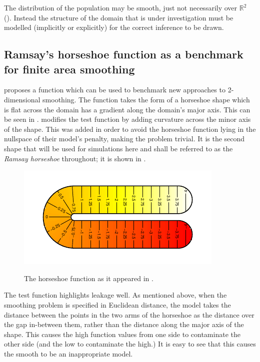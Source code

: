 The distribution of the population may be smooth, just not necessarily over $\mathbb{R}^2$ (\cite{wangranalli}). Instead the structure of the domain that is under investigation must be modelled (implicitly or explicitly) for the correct inference to be drawn.

\subsection{Ramsay's horseshoe function as a benchmark for finite area smoothing}

\label{ramsayfunc}

\cite{ramsay} proposes a function which can be used to benchmark new approaches to 2-dimensional smoothing. The function takes the form of a horseshoe shape which is flat across the domain has a gradient along the domain's major axis. This can be seen in . \cite{soap} modifies the test function by adding curvature across the minor axis of the shape. This was added in order to avoid the horseshoe function lying in the nullspace of their model's penalty, making the problem trivial. It is the second shape that will be used for simulations here and shall be referred to as the \emph{Ramsay horseshoe} throughout; it is shown in .

\begin{figure}
\centering
\includegraphics{intro/figs/orig-fs.pdf}\\
\caption{The horseshoe function as it appeared in \cite{ramsay}.}
\label{orig-fs}
\end{figure}

The test function highlights leakage well. As mentioned above, when the smoothing problem is specified in Euclidean distance, the model takes the distance between the points in the two arms of the horseshoe as the distance over the gap in-between them, rather than the distance along the major axis of the shape. This causes the high function values from one side to contaminate the other side (and the low to contaminate the high.) It is easy to see that this causes the smooth to be an inappropriate model.
		
